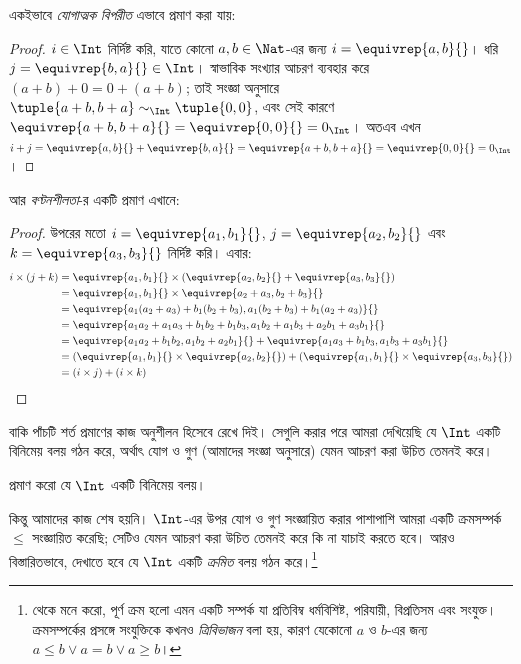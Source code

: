 \documentclass[../../../include/open-logic-section]{subfiles}
\begin{document}
একইভাবে \emph{যোগাত্মক বিপরীত} এভাবে প্রমাণ করা যায়:

\begin{proof}
$i \in \Int$ নির্দিষ্ট করি, যাতে কোনো $a,b \in
\Nat$-এর জন্য $i = \equivrep{a,b}{}$। ধরি $j = \equivrep{b,a}{} \in \Int$। স্বাভাবিক সংখ্যার আচরণ ব্যবহার করে $(a+b) + 0 = 0 + (a+b)$; তাই সংজ্ঞা অনুসারে $\tuple{a+b, b+a} \sim_\Int \tuple{0,0}$, এবং সেই কারণে $\equivrep{a+b, b+a}{} = \equivrep{0, 0}{} = 0_\Int$। অতএব এখন $i + j =
\equivrep{a,b}{}+\equivrep{b,a}{}=\equivrep{a+b, b+a}{}= \equivrep{0,
0}{} = 0_\Int$।
\end{proof}

আর \emph{বণ্টনশীলতা}-র একটি প্রমাণ এখানে:

\begin{proof}
উপরের মতো $i = \equivrep{a_1, b_1}{}$, $j =
\equivrep{a_2,b_2}{}$ এবং $k = \equivrep{a_3, b_3}{}$ নির্দিষ্ট করি। এবার:
\begin{align*}
	i \times (j + k)
	&= \equivrep{a_1, b_1}{} \times (\equivrep{a_2,b_2}{} + \equivrep{a_3, b_3}{})\\
	&= \equivrep{a_1, b_1}{} \times \equivrep{a_2 + a_3,b_2+b_3}{}\\
	&= \equivrep{a_1  (a_2 + a_3) + b_1  (b_2+b_3), a_1  (b_2 + b_3) + b_1 (a_2 + a_3)}{}\\
	&= \equivrep{a_1 a_2 + a_1a_3 + b_1 b_2+b_1b_3, a_1 b_2 + a_1b_3 + a_2b_1 + a_3b_1}{}\\
	&= \equivrep{a_1a_2 + b_1b_2, a_1b_2 + a_2b_1}{} + \equivrep{a_1a_3 + b_1b_3, a_1b_3 + a_3b_1}{}\\
	&= (\equivrep{a_1, b_1}{} \times \equivrep{a_2,b_2}{}) + (\equivrep{a_1, b_1}{} \times  \equivrep{a_3, b_3}{})\\
	&= (i \times j) + (i \times k)
\end{align*}
\end{proof}

বাকি পাঁচটি শর্ত প্রমাণের কাজ অনুশীলন হিসেবে রেখে দিই। সেগুলি করার পরে আমরা দেখিয়েছি যে $\Int$ একটি বিনিমেয় বলয় গঠন করে, অর্থাৎ যোগ ও গুণ (আমাদের সংজ্ঞা অনুসারে) যেমন আচরণ করা উচিত তেমনই করে।

\begin{prob}
প্রমাণ করো যে $\Int$ একটি বিনিমেয় বলয়।
\end{prob}

কিন্তু আমাদের কাজ শেষ হয়নি। $\Int$-এর উপর যোগ ও গুণ সংজ্ঞায়িত করার পাশাপাশি আমরা একটি ক্রমসম্পর্ক $\leq$ সংজ্ঞায়িত করেছি; সেটিও যেমন আচরণ করা উচিত তেমনই করে কি না যাচাই করতে হবে। আরও বিস্তারিতভাবে, দেখাতে হবে যে $\Int$ একটি \emph{ক্রমিত} বলয় গঠন করে।\footnote{ থেকে মনে করো, পূর্ণ ক্রম হলো এমন একটি সম্পর্ক যা প্রতিবিম্ব ধর্মবিশিষ্ট, পরিযায়ী, বিপ্রতিসম এবং সংযুক্ত। ক্রমসম্পর্কের প্রসঙ্গে সংযুক্তিকে কখনও \emph{ত্রিবিভাজন} বলা হয়, কারণ যেকোনো $a$ ও $b$-এর জন্য $a \leq b \lor a
	= b \lor a \geq b$।}
\end{document}
